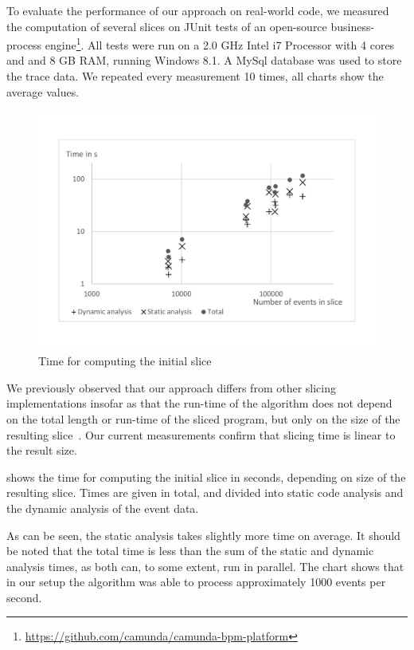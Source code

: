 ﻿\documentclass[
      english,
			conference,
      ]{IEEEtran}
\begin{document}
To evaluate the performance of our approach on real-world code, we measured the computation of several slices on JUnit tests of an open-source business-process engine\footnote{\url{https://github.com/camunda/camunda-bpm-platform}}.
All tests were run on a 2.0 GHz Intel i7 Processor with 4 cores and and 8 GB RAM, running Windows 8.1.
A MySql database was used to store the trace data.
We repeated every measurement 10 times, all charts show the average values.

\begin{figure}
	\centering
		\includegraphics[width=\linewidth, clip, trim={20mm 26mm 20mm 26mm}]{chart-initial.pdf}
	\caption{Time for computing the initial slice}
	\label{fig:chartinitial}
\end{figure}

We previously observed that our approach differs from other slicing implementations insofar as that the run-time of the algorithm does not depend on the total length or run-time of the sliced program, but only on the size of the resulting slice~\cite{treffer_dynamic_2014}.
Our current measurements confirm that slicing time is linear to the result size.

 shows the time for computing the initial slice in seconds, depending on size of the resulting slice.
Times are given in total, and divided into static code analysis and the dynamic analysis of the event data.

As can be seen, the static analysis takes slightly more time on average.
It should be noted that the total time is less than the sum of the static and dynamic analysis times, as both can, to some extent, run in parallel.
The chart shows that in our setup the algorithm was able to process approximately 1000 events per second.
\end{document}
